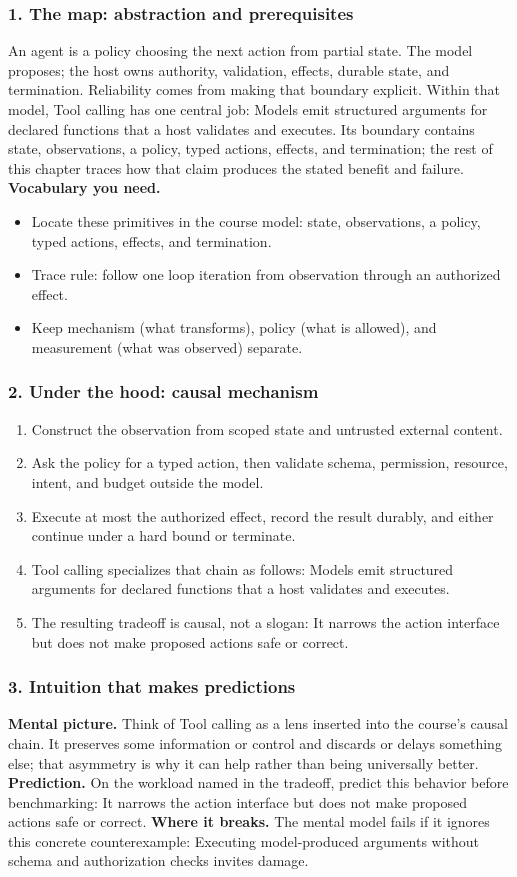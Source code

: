 \subsubsection*{1. The map: abstraction and prerequisites}
An agent is a policy choosing the next action from partial state. The model proposes; the host owns authority, validation, effects, durable state, and termination. Reliability comes from making that boundary explicit.
Within that model, Tool calling has one central job: Models emit structured arguments for declared functions that a host validates and executes. Its boundary contains state, observations, a policy, typed actions, effects, and termination; the rest of this chapter traces how that claim produces the stated benefit and failure.
\textbf{Vocabulary you need.}\begin{itemize}
\item Locate these primitives in the course model: state, observations, a policy, typed actions, effects, and termination.
\item Trace rule: follow one loop iteration from observation through an authorized effect.
\item Keep mechanism (what transforms), policy (what is allowed), and measurement (what was observed) separate.
\end{itemize}
\subsubsection*{2. Under the hood: causal mechanism}\begin{enumerate}
\item Construct the observation from scoped state and untrusted external content.
\item Ask the policy for a typed action, then validate schema, permission, resource, intent, and budget outside the model.
\item Execute at most the authorized effect, record the result durably, and either continue under a hard bound or terminate.
\item Tool calling specializes that chain as follows: Models emit structured arguments for declared functions that a host validates and executes.
\item The resulting tradeoff is causal, not a slogan: It narrows the action interface but does not make proposed actions safe or correct.
\end{enumerate}
\subsubsection*{3. Intuition that makes predictions}
\textbf{Mental picture.} Think of Tool calling as a lens inserted into the course's causal chain. It preserves some information or control and discards or delays something else; that asymmetry is why it can help rather than being universally better.
\textbf{Prediction.} On the workload named in the tradeoff, predict this behavior before benchmarking: It narrows the action interface but does not make proposed actions safe or correct.
\textbf{Where it breaks.} The mental model fails if it ignores this concrete counterexample: Executing model-produced arguments without schema and authorization checks invites damage.
